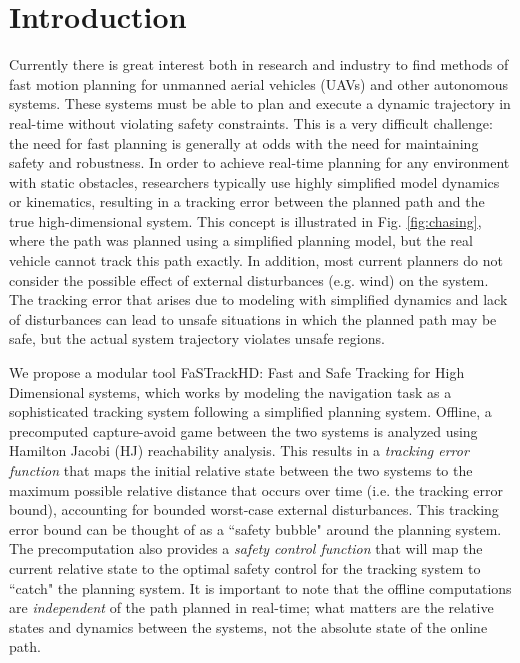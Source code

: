 \section{Introduction}
 Currently there is great interest both in research and industry to find methods of fast motion planning for unmanned aerial vehicles (UAVs) and other autonomous systems. These systems must be able to plan and execute a dynamic trajectory in real-time without violating safety constraints. This is a very difficult challenge: the need for fast planning is generally at odds with the need for maintaining safety and robustness. In order to achieve real-time planning for any environment with static obstacles, researchers typically use highly simplified model dynamics or kinematics, resulting in a tracking error between the planned path and the true high-dimensional system. This concept is illustrated in Fig. \ref{fig:chasing}, where the path was planned using a simplified planning model, but the real vehicle cannot track this path exactly. In addition, most current planners do not consider the possible effect of external disturbances (e.g. wind) on the system. The tracking error that arises due to modeling with simplified dynamics and lack of disturbances can lead to unsafe situations in which the planned path may be safe, but the actual system trajectory violates unsafe regions.

We propose a modular tool FaSTrackHD: Fast and Safe Tracking for High Dimensional systems, which works by modeling the navigation task as a sophisticated tracking system following a simplified planning system. Offline, a precomputed capture-avoid game between the two systems is analyzed using Hamilton Jacobi (HJ) reachability analysis. This results in a \textit{tracking error function} that maps the initial relative state between the two systems to the maximum possible relative distance that occurs over time (i.e. the tracking error bound), accounting for bounded worst-case external disturbances. This tracking error bound can be thought of as a ``safety bubble" around the planning system. The precomputation also provides a \textit{safety control function} that will map the current relative state to the optimal safety control for the tracking system to ``catch" the planning system. It is important to note that the offline computations are \textit{independent} of the path planned in real-time; what matters are the relative states and dynamics between the systems, not the absolute state of the online path.

